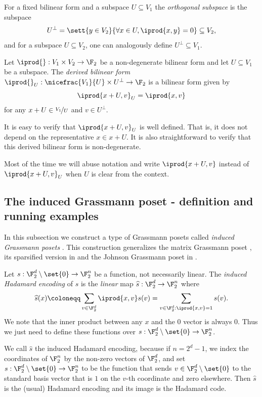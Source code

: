 For a fixed bilinear form and a subspace \(U \subseteq V_1\) the \emph{orthogonal subspace} is the subspace \[U^\bot = \sett{y \in V_2}{\forall x \in U, \iprod{x,y}=0} \subseteq V_2,\]
and for a subspace \(U \subseteq V_2\), one can analogously define \(U^\bot \subseteq V_1\). 
\begin{definition}
    Let \(\iprod{}:V_1 \times V_2 \to \F_2\) be a non-degenerate bilinear form and let \(U \subseteq V_1\) be a subspace. The \emph{derived bilinear form} \(\iprod{}_U:\nicefrac{V_1}{U} \times U^\bot \to \F_2\) is a bilinear form given by
\[\iprod{x+U,v}_U = \iprod{x,v}\]
for any \(x+U \in \nicefrac{V_1}{U}\) and \(v \in U^\bot\).
\end{definition}
It is easy to verify that \(\iprod{x+U,v}_U\) is well defined. That is, it does not depend on the representative \(x \in x+U\). It is also straightforward to verify that this derived bilinear form is non-degenerate.

Most of the time we will abuse notation and write \(\iprod{x+U,v}\) instead of \(\iprod{x+U,v}_U\) when $U$ is clear from the context.

\subsection{The induced Grassmann poset - definition and running examples}
In this subsection we construct a type of Grassmann posets called \emph{induced Grassmann posets} . This construction generalizes the matrix Grassmann poset \cite{Golowich2023}, its sparsified version in  and the Johnson Grassmann poset in .

Let \(s:\F_2^d \setminus \set{0} \to \F_2^n\) be a function, not necessarily linear. The \emph{induced Hadamard encoding} of \(s\) is the \emph{linear} map \(\widehat{s}:\F_2^d \to \F_2^n\) where 
\[\widehat{s}(x) \coloneqq \sum_{v \in \F_2^d}\iprod{x,v} s(v) = \sum_{v \in \F_2^d: \iprod{x,v}=1} s(v).\]
We note that the inner product between any $x$ and the \(0\) vector is always \(0\). Thus we just need to define these functions over \(s:\F_2^d \setminus \set{0} \to \F_2^n\).

We call \(\widehat{s}\) the induced Hadamard encoding, because if \(n=2^d - 1\), we index the coordinates of \(\F_2^{n}\) by the non-zero vectors of \(\F_2^d\), and set \(s:\F_2^d \setminus \set{0} \to \F_2^{n}\) to be the function that sends $v\in\F_2^d\setminus\set{0}$ to the standard basis vector that is \(1\) on the \(v\)-th coordinate and zero elsewhere. Then \(\widehat{s}\) is the (usual) Hadamard encoding and its image is the Hadamard code. %

